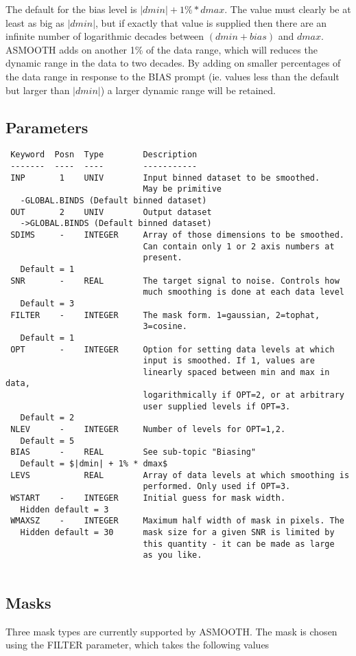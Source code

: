 \documentclass{book}
\renewcommand{\_}{{\tt\char'137}}     %
\begin{document}
The default for the bias level is $|dmin| + 1\% * dmax$. The value
must clearly be at least as big as $|dmin|$, but if exactly that value
is supplied then there are an infinite number of logarithmic
decades between $(dmin+bias)$ and $dmax$. ASMOOTH adds on another 1\%
of the data range, which will reduces the dynamic range in the
data to two decades. By adding on smaller percentages of the data
range in response to the BIAS prompt (ie. values less than the
default but larger than $|dmin|$) a larger dynamic range will be
retained.
 
\subsection{Parameters}
\begin{verbatim}
 Keyword  Posn  Type        Description
 -------  ----  ----        -----------
 INP       1    UNIV        Input binned dataset to be smoothed.
                            May be primitive
   -GLOBAL.BINDS (Default binned dataset)
 OUT       2    UNIV        Output dataset
   ->GLOBAL.BINDS (Default binned dataset)
 SDIMS     -    INTEGER     Array of those dimensions to be smoothed.
                            Can contain only 1 or 2 axis numbers at
                            present.
   Default = 1
 SNR       -    REAL        The target signal to noise. Controls how
                            much smoothing is done at each data level
   Default = 3
 FILTER    -    INTEGER     The mask form. 1=gaussian, 2=tophat,
                            3=cosine.
   Default = 1
 OPT       -    INTEGER     Option for setting data levels at which
                            input is smoothed. If 1, values are
                            linearly spaced between min and max in data,
                            logarithmically if OPT=2, or at arbitrary
                            user supplied levels if OPT=3.
   Default = 2
 NLEV      -    INTEGER     Number of levels for OPT=1,2.
   Default = 5
 BIAS      -    REAL        See sub-topic "Biasing"
   Default = $|dmin| + 1% * dmax$
 LEVS           REAL        Array of data levels at which smoothing is
                            performed. Only used if OPT=3.
 WSTART    -    INTEGER     Initial guess for mask width.
   Hidden default = 3
 WMAXSZ    -    INTEGER     Maximum half width of mask in pixels. The
   Hidden default = 30      mask size for a given SNR is limited by
                            this quantity - it can be made as large
                            as you like.
 
\end{verbatim}\subsection{Masks}
Three mask types are currently supported by ASMOOTH. The mask is
chosen using the FILTER parameter, which takes the following values
 
\end{document}
